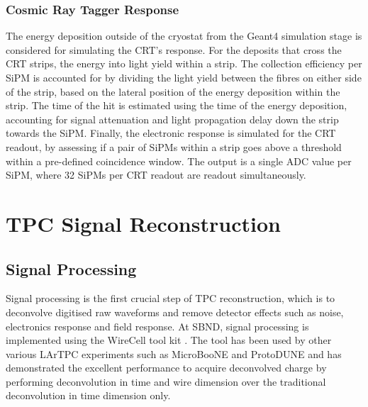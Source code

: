 \subsubsection{Cosmic Ray Tagger Response}

The energy deposition outside of the cryostat from the Geant4 simulation stage is considered for simulating the CRT's response.
For the deposits that cross the CRT strips, the energy into light yield within a strip.
The collection efficiency per SiPM is accounted for by dividing the light yield between the fibres on either side of the strip, based on the lateral position of the energy deposition within the strip. 
The time of the hit is estimated using the time of the energy deposition, accounting for signal attenuation and light propagation delay down the strip towards the SiPM.
Finally, the electronic response is simulated for the CRT readout, by assessing if a pair of SiPMs within a strip goes above a threshold within a pre-defined coincidence window.
The output is a single ADC value per SiPM, where 32 SiPMs per CRT readout are readout simultaneously. 


\section{TPC Signal Reconstruction}

\subsection{Signal Processing}
Signal processing is the first crucial step of TPC reconstruction, which is to deconvolve digitised raw waveforms and remove detector effects such as noise, electronics response and field response. 
At SBND, signal processing is implemented using the WireCell tool kit \cite{wirecell}.
The tool has been used by other various LArTPC experiments such as MicroBooNE and ProtoDUNE and has demonstrated the excellent performance to acquire deconvolved charge by performing deconvolution in time and wire dimension over the traditional deconvolution in time dimension only. 


